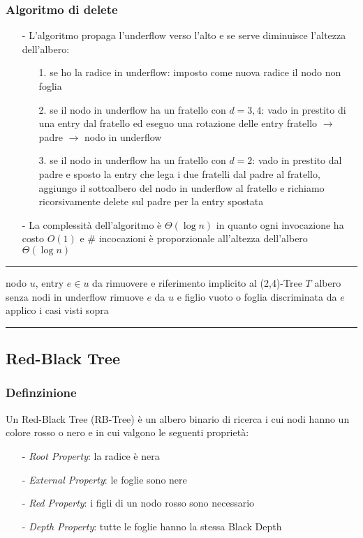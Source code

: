 \documentclass[a4paper]{article}
\makeatletter
\newenvironment{algo}[4]{
	\noindent\rule{\textwidth}{0.4pt}
	\begin{algorithmic}[1]
		\addtocounter{ALG@line}{-1}
		\Procedure{#1}{#2}
		\Require #3
		\Ensure #4
		\Statex }{
		\EndProcedure
	\end{algorithmic}
	\rule{\textwidth}{0.4pt}}
\makeatother
\begin{document}
\subsubsection*{Algoritmo di delete}
\begin{itemize}[topsep=3pt, itemsep=0pt]
	\item[-] L'algoritmo propaga l'underflow verso l'alto e se serve diminuisce l'altezza dell'albero:
	\begin{itemize}[topsep=0pt, itemsep=0pt]
		\item[1.] se ho la radice in underflow: imposto come nuova radice il nodo non foglia
		\item[2.] se il nodo in underflow ha un fratello con \(d = 3,4\): vado in prestito di una entry dal fratello ed eseguo
		una rotazione delle entry fratello \(\rightarrow\) padre \(\rightarrow\) nodo in underflow
		\item[3.] se il nodo in underflow ha un fratello con \(d = 2\): vado in prestito dal padre e sposto la entry che lega i
		due fratelli dal padre al fratello,	aggiungo il sottoalbero del nodo in underflow al fratello e richiamo ricorsivamente
		delete sul padre per la entry spostata
	\end{itemize}
	\item[-] La complessità dell'algoritmo è \(\Theta(\log n)\) in quanto ogni invocazione ha costo \(O(1)\) e \# incocazioni
	è proporzionale all'altezza dell'albero \(\Theta(\log n)\)
\end{itemize}
\begin{algo}{delete}{$u$, $e$}{nodo $u$, entry $e \in u$ da rimuovere e riferimento implicito al (2,4)-Tree $T$}{albero senza nodi in underflow}
	\State rimuove $e$ da $u$ e figlio vuoto o foglia discriminata da $e$
	\State applico i casi visti sopra
\end{algo}

\vspace{4em}

\subsection{Red-Black Tree}
\subsubsection*{Definzinione}
Un Red-Black Tree (RB-Tree) è un albero binario di ricerca i cui nodi hanno un colore rosso o nero e in cui valgono le seguenti
proprietà:
\begin{itemize}[topsep=3pt, itemsep=0pt]
	\item[-] \textit{Root Property}: la radice è nera
	\item[-] \textit{External Property}: le foglie sono nere
	\item[-] \textit{Red Property}: i figli di un nodo rosso sono necessario
	\item[-] \textit{Depth Property}: tutte le foglie hanno la stessa Black Depth
\end{itemize}
\end{document}
